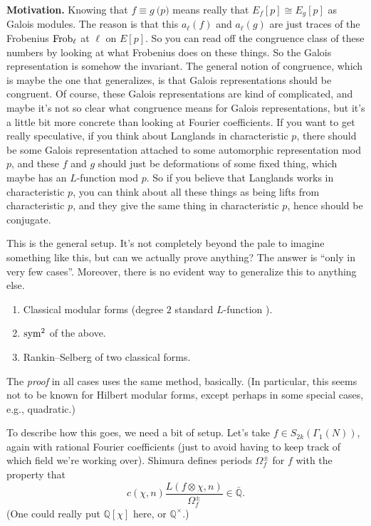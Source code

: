 \documentclass[reqno]{amsart} 
\begin{document}
\textbf{Motivation.}  Knowing that $f \equiv g \pod{p}$ means really that $E_f [p] \cong E_g [p]$ as Galois modules.  The reason is that this $a_{\ell}(f)$ and $a_{\ell}(g)$ are just traces of the Frobenius $\operatorname{Frob}_{\ell}$ at $\ell$ on $E [p]$.  So you can read off the congruence class of these numbers by looking at what Frobenius does on these things.  So the Galois representation is somehow the invariant.  The general notion of congruence, which is maybe the one that generalizes, is that Galois representations should be congruent.  Of course, these Galois representations are kind of complicated, and maybe it's not so clear what congruence means for Galois representations, but it's a little bit more concrete than looking at Fourier coefficients.  If you want to get really speculative, if you think about Langlands in characteristic $p$, there should be some Galois representation attached to some automorphic representation mod $p$, and these $f$ and $g$ should just be deformations of some fixed thing, which maybe has an $L$-function mod $p$.  So if you believe that Langlands works in characteristic $p$, you can think about all these things as being lifts from characteristic $p$, and they give the same thing in characteristic $p$, hence should be conjugate.

This is the general setup.  It's not completely beyond the pale to imagine something like this, but can we actually prove anything?  The answer is ``only in very few cases''.  Moreover, there is no evident way to generalize this to anything else.
\begin{enumerate}
\item Classical modular forms (degree $2$ standard $L$-function ).
\item $\operatorname{sym}^2$ of the above.
\item Rankin--Selberg of two classical forms.
\end{enumerate}
The \emph{proof} in all cases uses the same method, basically.  (In particular, this seems not to be known for Hilbert modular forms, except perhaps in some special cases, e.g., quadratic.)

To describe how this goes, we need a bit of setup.  Let's take $f \in S_{2 k}(\Gamma_1(N))$, again with rational Fourier coefficients (just to avoid having to keep track of which field we're working over).  Shimura defines periods $\Omega_f^{\pm}$ for $f$ with the property that
\begin{equation*}
  c(\chi, n) \frac{L(f \otimes \chi, n)}{\Omega_f^{\pm}} \in \bar{\mathbb{Q}}.
\end{equation*}
(One could really put $\mathbb{Q} [\chi]$ here, or $\mathbb{Q}^\times$.)
\end{document}
